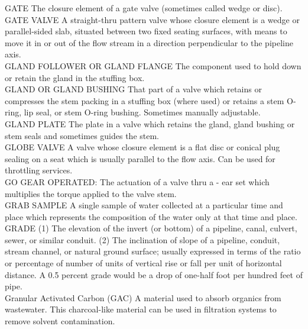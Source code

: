 \documentclass{article}
\begin{document}
GATE
The closure element of a gate valve (sometimes called wedge or disc).
\vspace{0.3cm}\\
GATE VALVE
A straight-thru pattern valve whose closure element is a wedge or parallel-sided slab, situated between two fixed seating surfaces, with means to move it in or out of the flow stream in a direction perpendicular to the pipeline axis.
\vspace{0.3cm}\\
GLAND FOLLOWER OR GLAND FLANGE
The component used to hold down or retain the gland in the stuffing box.
\vspace{0.3cm}\\
GLAND OR GLAND BUSHING
That part of a valve which retains or compresses the stem packing in a stuffing box (where used) or retains a stem O-ring, lip seal, or stem O-ring bushing. Sometimes manually adjustable.
\vspace{0.3cm}\\
GLAND PLATE
The plate in a valve which retains the gland, gland bushing or stem seals and sometimes guides the stem.
\vspace{0.3cm}\\
GLOBE VALVE
A valve whose closure element is a flat disc or conical plug sealing on a seat which is usually parallel to the flow axis. Can be used for throttling services.
\vspace{0.3cm}\\
GO
GEAR OPERATED:  The actuation of a valve thru a - ear set which multiplies the torque applied to the valve stem.
\vspace{0.3cm}\\
GRAB SAMPLE
A single sample of water collected at a particular time and place which represents the composition of the water only at that time and place.
\vspace{0.3cm}\\
GRADE
(1) The elevation of the invert (or bottom) of a pipeline, canal, culvert, sewer, or similar conduit. (2) The inclination of slope of a pipeline, conduit, stream channel, or natural ground surface; usually expressed in terms of the ratio or percentage of number of units of vertical rise or fall per unit of horizontal distance. A 0.5 percent grade would be a drop of one-half foot per hundred feet of pipe. 
\vspace{0.3cm}\\
Granular Activated Carbon (GAC)
A material used to absorb organics from wastewater. This charcoal-like material can be used in filtration systems to remove solvent contamination.
\end{document}
